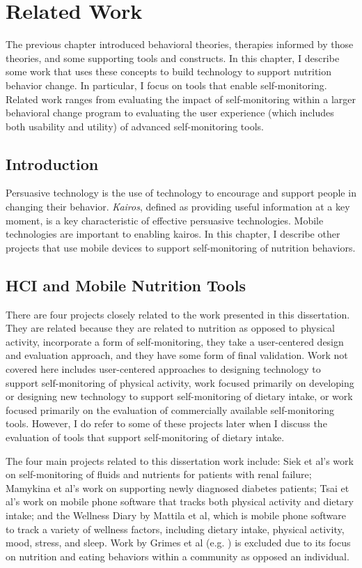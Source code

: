 \chapter{Related Work}
\label{cha:relatedWork}

The previous chapter introduced behavioral theories, therapies informed by those theories, and some supporting tools and constructs. In this chapter, I describe some work that uses these concepts to build technology to support nutrition behavior change. In particular, I focus on tools that enable self-monitoring. Related work ranges from evaluating the impact of self-monitoring within a larger behavioral change program to evaluating the user experience (which includes both usability and utility) of advanced self-monitoring tools. 

\section{Introduction}
Persuasive technology is the use of technology to encourage and support people in changing their behavior. \textit{Kairos}, defined as providing useful information at a key moment, is a key characteristic of effective persuasive technologies. Mobile technologies are important to enabling kairos. In this chapter, I describe other projects that use mobile devices to support self-monitoring of nutrition behaviors. 


\section{HCI and Mobile Nutrition Tools}
There are four projects closely related to the work presented in this dissertation. They are related because they are related to nutrition as opposed to physical activity, incorporate a form of self-monitoring, they take a user-centered design and evaluation approach, and they have some form of final validation. Work not covered here includes user-centered approaches to designing technology to support self-monitoring of physical activity, work focused primarily on developing or designing new technology to support self-monitoring of dietary intake, or work focused primarily on the evaluation of commercially available self-monitoring tools. However, I do refer to some of these projects later when I discuss the evaluation of tools that support self-monitoring of dietary intake. 

The four main projects related to this dissertation work include: Siek et al's \citep{siek_bridging_2009, siek_design_2006, siek_when_2006} work on self-monitoring of fluids and nutrients for patients with renal failure; Mamykina et al's work on supporting newly diagnosed diabetes patients; Tsai et al's work on mobile phone software that tracks both physical activity and dietary intake; and the Wellness Diary by Mattila et al, which is mobile phone software to track a variety of wellness factors, including dietary intake, physical activity, mood, stress, and sleep. Work by Grimes et al (e.g. ) is excluded due to its focus on nutrition and eating behaviors within a community as opposed an individual. 

